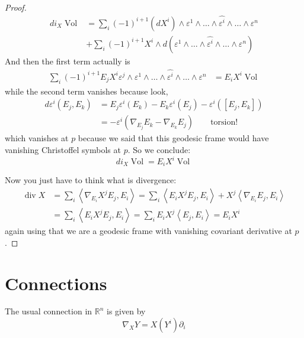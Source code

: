 \begin{proof}
\begin{align*}
d i_X\operatorname{Vol}
&=\sum_i(-1)^{i+1}(dX^i)\wedge\varepsilon^1\wedge\ldots
\wedge\widehat{\varepsilon^i}\wedge\ldots\wedge\varepsilon^n\\
&+\sum_{i}(-1)^{i+1}X^i\wedge 
d(\varepsilon^1\wedge\ldots\wedge\widehat{\varepsilon^i}\wedge\ldots
\wedge\varepsilon^n)\end{align*}
And then the first term actually is
\begin{align*}
\sum_i(-1)^{i+1}E_jX^i\varepsilon^j\wedge\varepsilon^1\wedge\ldots
\wedge\widehat{\varepsilon^i}\wedge\ldots\wedge\varepsilon^n
&=E_iX^i\operatorname{Vol}
\end{align*}
while the second term vanishes because look,
\begin{align*}d \varepsilon^i(E_j,E_k)
&=E_j\varepsilon^i(E_k)-E_k\varepsilon^i(E_j)-\varepsilon^i([E_j,E_k])\\
&=-\varepsilon^i(\nabla_{E_j}E_k-\nabla_{E_k}E_j)\qquad \text{torsion!}
\end{align*}
which vanishes at $p$ because we said that this geodesic frame would have
 vanishing Christoffel symbols at $p$. So we conclude:
\[di_X \operatorname{Vol}=E_iX^i\operatorname{Vol}\]

Now you just have to think what is divergence:
\begin{align*}
\operatorname{div}X&=\sum_{i}\left<\nabla_{E_i}X^jE_j,E_i\right>
=\sum_{i}\left<E_iX^jE_j,E_i\right>+X^j\left<\nabla_{E_i}E_j,E_i\right>\\
&=\sum_i \left<E_iX^jE_j,E_i\right>=\sum_iE_iX^j\left<E_j,E_i\right>=E_iX^i
\end{align*}
again using that we are a geodesic frame with vanishing covariant 
derivative at $p$.
\end{proof}

\section{Connections}
\label{section-connections}

\begin{example}
\label{example-euclidean-connection}
The usual connection in $\mathbb{R}^n$ is given by 
$$
\nabla_XY=X(Y^i)\partial_i
$$
\end{example}

\begin{proposition}
\label{proposition-existence-of-pullback-connection}
\end{proposition}

